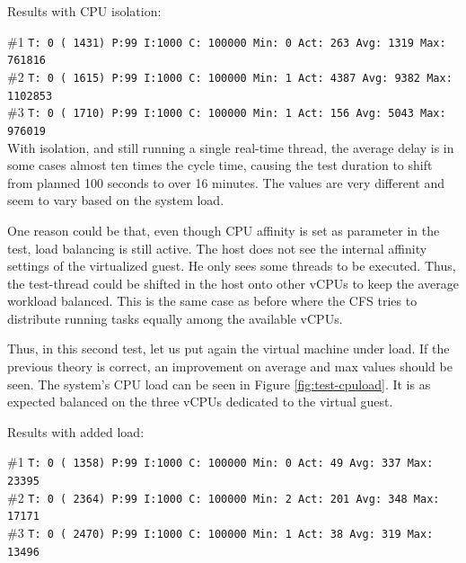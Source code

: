 \documentclass[]{scrartcl}
\begin{document}
\noindent Results with CPU isolation:

\noindent \small \#1 \texttt{T: 0 ( 1431) P:99 I:1000 C: 100000 Min: 0 Act:  263 Avg: 1319 Max:  761816}\\
\noindent \small \#2 \texttt{T: 0 ( 1615) P:99 I:1000 C: 100000 Min: 1 Act: 4387 Avg: 9382 Max: 1102853}\\
\noindent \small \#3 \texttt{T: 0 ( 1710) P:99 I:1000 C: 100000 Min: 1 Act:  156 Avg: 5043 Max:  976019}\\


With isolation, and still running a single real-time thread, the average delay is in some cases almost ten times the cycle time, causing the test duration to shift from planned 100 seconds to over 16 minutes. The values are very different and seem to vary based on the system load. 

One reason could be that, even though CPU affinity is set as parameter in the test, load balancing is still active. The host does not see the internal affinity settings of the virtualized guest. He only sees some threads to be executed.
Thus, the test-thread could be shifted in the host onto other vCPUs to keep the average workload balanced. This is the same case as before where the CFS tries to distribute running tasks equally among the available vCPUs.

Thus, in this second test, let us put again the virtual machine under load. If the previous theory is correct, an improvement on average and max values should be seen. The system's CPU load can be seen in Figure \ref{fig:test-cpuload}. It is as expected balanced on the three vCPUs dedicated to the virtual guest.

\noindent Results with added load: 

\noindent \small \#1 \texttt{T: 0 ( 1358) P:99 I:1000 C: 100000 Min: 0 Act:   49 Avg:  337 Max:   23395}\\
\noindent \small \#2 \texttt{T: 0 ( 2364) P:99 I:1000 C: 100000 Min: 2 Act:  201 Avg:  348 Max:   17171}\\
\noindent \small \#3 \texttt{T: 0 ( 2470) P:99 I:1000 C: 100000 Min: 1 Act:   38 Avg:  319 Max:   13496}
\end{document}
